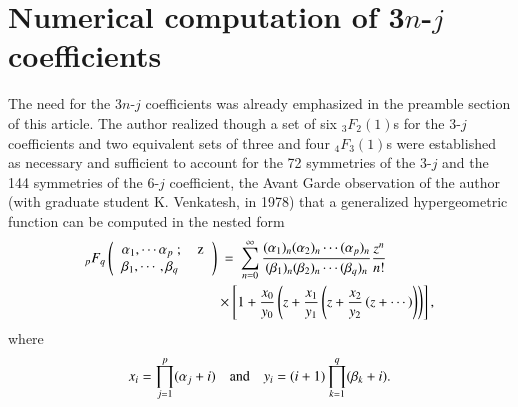 \section*{Numerical computation of 3$n$-$j$ coefficients}

The need for the 3$n$-$j$ coefficients was already emphasized in the preamble section of this article. The author realized though a set of six $_3F_2(1)$s for the 3-$j$ coefficients and two equivalent sets of three and four $_4F_3(1)$s were established as necessary and sufficient to account for the 72 symmetries of the 3-$j$ and the 144 symmetries of the 6-$j$ coefficient, the Avant Garde observation of the author (with graduate student K. Venkatesh, in 1978) that a generalized hypergeometric function can be computed in the nested form
\begin{equation}
\begin{split}
{}_pF_q
\left( 
\begin{tabular}{lr} 
$\alpha_1,\cdots \alpha_p\ ;$ & z\\
$\beta_1,\cdots, \beta_q $& \\ 
\end{tabular} 
\right) & \ =\ \sum_{n=0}^\infty 
\frac{(\alpha_1)_n (\alpha_2)_n \cdots (\alpha_p)_n}{(\beta_1)_n (\beta_2)_n \cdots (\beta_q)_n}
\frac{z^n}{n!}\\
& \times \left[ 1 + \frac{x_0}{y_0}\left(z + \frac{x_1}{y_1}\left( z + \frac{x_2}{y_2}\left(z + \cdots 
\right) \right) \right) \right], \label{chap29-eq59}
\end{split}
\end{equation}
where
\begin{equation}
x_i=\prod_{j=1}^p (\alpha_j + i)\quad {\rm and}\quad y_i= (i+1)\prod_{k=1}^q (\beta_k + i).\label{chap29-eq60}
\end{equation}

